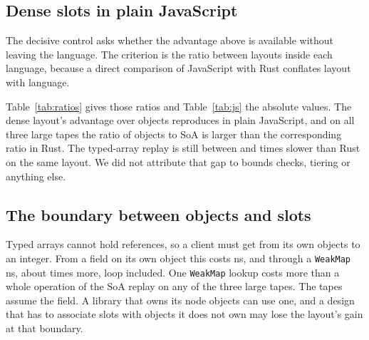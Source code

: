 \documentclass[11pt]{article}
\begin{document}
\begin{table}[tbp]
\centering
\scriptsize

\caption{Graph-shaped tapes in Rust. The first three columns are ns/op, median [min, max]; the columns headed B are peak bytes per peak live relation for the same three layouts in order.}
\label{tab:graph}
\end{table}

\subsection{Dense slots in plain JavaScript}

The decisive control asks whether the advantage above is available without leaving the language. The criterion is the ratio between layouts inside each language, because a direct comparison of JavaScript with Rust conflates layout with language.

Table~\ref{tab:ratios} gives those ratios and Table~\ref{tab:js} the absolute values. The dense layout's advantage over objects reproduces in plain JavaScript, and on all three large tapes the ratio of objects to SoA is larger than the corresponding ratio in Rust. The typed-array replay is still between \jsOverRustMin{} and \jsOverRustMax{} times slower than Rust on the same layout. We did not attribute that gap to bounds checks, tiering or anything else.

\begin{table}[tbp]
\centering
\scriptsize

\caption{Ratios of nanoseconds per operation, median [min, max] across processes.}
\label{tab:ratios}
\end{table}

\begin{table}[tbp]
\centering
\scriptsize

\caption{Plain JavaScript on V8. Columns as in Table~\ref{tab:graph}. Typed-array bytes count old and new arrays during doubling; object bytes are a heap delta after a collection and are measured on the synthetic tapes only, so bytes do not compare across layouts. Alien's tape has few operations and is dominated by warm-up, as its range shows; we draw no conclusion from that row.}
\label{tab:js}
\end{table}

\subsection{The boundary between objects and slots}

Typed arrays cannot hold references, so a client must get from its own objects to an integer. From a field on its own object this costs \boundaryFieldNs{} ns, and through a \texttt{WeakMap} \boundaryWeakNs{} ns, about \boundaryRatio{} times more, loop included. One \texttt{WeakMap} lookup costs more than a whole operation of the SoA replay on any of the three large tapes. The tapes assume the field. A library that owns its node objects can use one, and a design that has to associate slots with objects it does not own may lose the layout's gain at that boundary.
\end{document}
